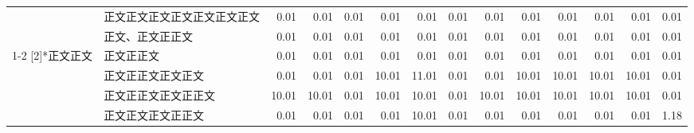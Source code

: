 {\begin{tabular}{llrrrrrrrrrrrr}
                                                   & 正文正文正文正文正文正文正文   & 0.01                                         & 0.01                     & 0.01                     & 0.01                                         & 0.01                  & 0.01                  & 0.01                  & 0.01                  & 0.01                  & 0.01                  & 0.01                  & \multicolumn{1}{c}{0.01}  \\
                                                   & 正文、正文正正文               & 0.01                                         & 0.01                     & 0.01                     & 0.01                                         & 0.01                  & 0.01                  & 0.01                  & 0.01                  & 0.01                  & 0.01                  & 0.01                  & \multicolumn{1}{c}{0.01}  \\
    \cmidrule{1-2}    \multirow{6}[2]{*}{正文正文} & 正文正正文                     & 0.01                                         & 0.01                     & 0.01                     & 0.01                                         & 0.01                  & 0.01                  & 0.01                  & 0.01                  & 0.01                  & 0.01                  & 0.01                  & \multicolumn{1}{c}{0.01}  \\
                                                   & 正文正正文正文正文             & 0.01                                         & 0.01                     & 0.01                     & 10.01                                        & 11.01                 & 0.01                  & 0.01                  & 10.01                 & 10.01                 & 10.01                 & 10.01                 & \multicolumn{1}{c}{0.01}  \\
                                                   & 正文正正文正文正正文           & 10.01                                        & 10.01                    & 0.01                     & 10.01                                        & 10.01                 & 0.01                  & 10.01                 & 10.01                 & 10.01                 & 10.01                 & 10.01                 & \multicolumn{1}{c}{0.01}  \\
                                                   & 正文正文正文正正文             & 0.01                                         & 0.01                     & 0.01                     & 0.01                                         & 10.01                 & 0.01                  & 0.01                  & 0.01                  & 0.01                  & 0.01                  & 0.01                  & \multicolumn{1}{c}{1.18 } \\

\end{tabular}}
